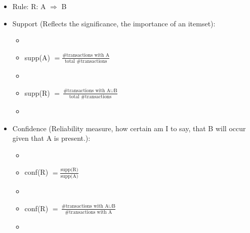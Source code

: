 \begin{breakbox}
\begin{itemize}
	\item Rule: R: A $\Rightarrow$ B
	\item Support (Reflects the significance, the importance of an itemset):
		\begin{itemize}
			\item[]
			\item[] supp(A) $= \frac{\text{\#transactions with A}}{\text{total \#transactions}}$
			\item[]
			\item[] supp(R) $= \frac{\text{\#transactions with A} \cup \text{B}}{\text{total \#transactions}}$
			\item[]
		\end{itemize}
	\item Confidence (Reliability measure, how certain am I to say, that B will occur given that A is present.):
		\begin{itemize}
			\item[]
			\item[] conf(R) $= \frac{\text{supp(R)}}{\text{supp(A)}}$
			\item[]
			\item[] conf(R) $= \frac{\text{\#transactions with A} \cup \text{B}}{\text{\#transactions with A}}$
			\item[]
		\end{itemize}
\end{itemize}
\end{breakbox}

